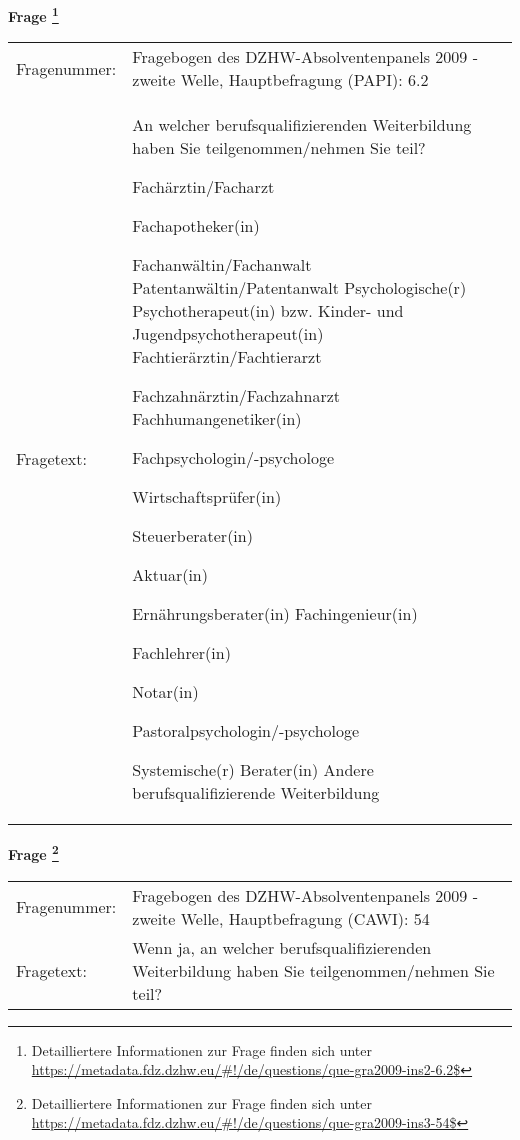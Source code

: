 				\vspace*{0.5cm}
                \noindent\textbf{Frage
	                \footnote{Detailliertere Informationen zur Frage finden sich unter
		              \url{https://metadata.fdz.dzhw.eu/\#!/de/questions/que-gra2009-ins2-6.2$}}}\\
				\begin{tabularx}{\hsize}{@{}lX}
					Fragenummer: &
					  Fragebogen des DZHW-Absolventenpanels 2009 - zweite Welle, Hauptbefragung (PAPI):
					  6.2
 \\
					Fragetext: & An welcher berufsqualifizierenden Weiterbildung haben Sie teilgenommen/nehmen Sie teil?\par  Fachärztin/Facharzt\par  Fachapotheker(in)\par  Fachanwältin/Fachanwalt Patentanwältin/Patentanwalt Psychologische(r) Psychotherapeut(in) bzw. Kinder- und Jugendpsychotherapeut(in) Fachtierärztin/Fachtierarzt\par  Fachzahnärztin/Fachzahnarzt Fachhumangenetiker(in)\par  Fachpsychologin/-psychologe\par  Wirtschaftsprüfer(in)\par  Steuerberater(in)\par  Aktuar(in)\par  Ernährungsberater(in) Fachingenieur(in)\par  Fachlehrer(in)\par  Notar(in)\par  Pastoralpsychologin/-psychologe\par  Systemische(r) Berater(in) Andere berufsqualifizierende Weiterbildung \\
				\end{tabularx}
				\vspace*{0.5cm}
                \noindent\textbf{Frage
	                \footnote{Detailliertere Informationen zur Frage finden sich unter
		              \url{https://metadata.fdz.dzhw.eu/\#!/de/questions/que-gra2009-ins3-54$}}}\\
				\begin{tabularx}{\hsize}{@{}lX}
					Fragenummer: &
					  Fragebogen des DZHW-Absolventenpanels 2009 - zweite Welle, Hauptbefragung (CAWI):
					  54
 \\
					Fragetext: & Wenn ja, an welcher berufsqualifizierenden Weiterbildung haben Sie teilgenommen/nehmen Sie teil? \\
				\end{tabularx}






